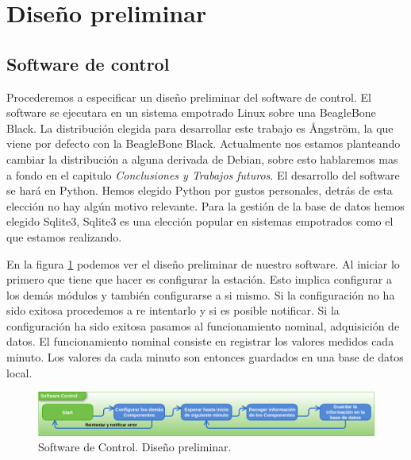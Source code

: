 \section{Diseño preliminar}
	\subsection{Software de control}
		Procederemos a especificar un diseño preliminar del software de control. El software se ejecutara en un sistema empotrado Linux sobre
		una BeagleBone Black. La distribución elegida para desarrollar este trabajo es Ångström, la que viene por defecto con la BeagleBone
		Black. Actualmente nos estamos planteando cambiar la distribución a alguna derivada de Debian, sobre esto hablaremos mas a fondo en el
		capitulo \emph{Conclusiones y Trabajos futuros}. El desarrollo del software se hará en Python. Hemos elegido Python por gustos
		personales, detrás de esta elección no hay algún motivo relevante. Para la gestión de la base de datos hemos elegido Sqlite3,
		Sqlite3 es una elección popular en sistemas empotrados como el que estamos realizando. 
		\par
		En la figura \ref{fig:soft_control_preliminar} podemos ver el diseño preliminar de nuestro software. Al iniciar lo primero que 
		tiene que hacer es configurar la estación. Esto implica configurar a los demás módulos y también configurarse a si mismo. Si la
		configuración no ha sido exitosa procedemos a re intentarlo y si es posible notificar. Si la configuración ha sido exitosa pasamos al
		funcionamiento nominal, adquisición de datos. El funcionamiento nominal consiste en registrar los valores medidos cada minuto. Los
		valores da cada minuto son entonces guardados en una base de datos local.
		\begin{figure}[h]
			\centering
			\includegraphics[keepaspectratio, width=1\textwidth]{./img/soft_control_preliminar.png}
			\caption{Software de Control. Diseño preliminar.}
			\label{fig:soft_control_preliminar}
		\end{figure}
